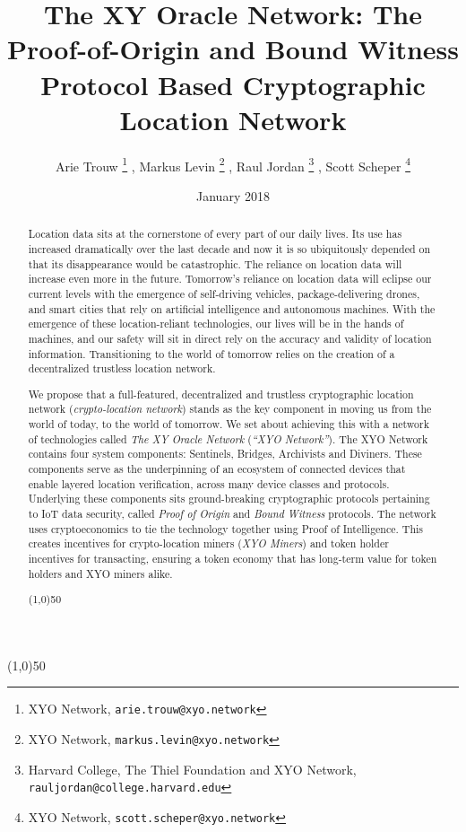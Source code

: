 \documentclass{article}
\title {The XY Oracle Network: The Proof-of-Origin and Bound Witness Protocol Based Cryptographic Location Network}
\author{
    Arie Trouw
        \thanks{XYO Network, \texttt{arie.trouw@xyo.network}}
    , Markus Levin
        \thanks{XYO Network, \texttt{markus.levin@xyo.network}}
    , Raul Jordan
        \thanks{Harvard College, The Thiel Foundation and XYO Network, \texttt{rauljordan@college.harvard.edu}}
    , Scott Scheper
        \thanks{XYO Network, \texttt{scott.scheper@xyo.network}}
}
\date{January 2018}
\begin{document}
\maketitle

\begin{center}
\line(1,0){50}
\end{center}


\begin{abstract}
Location data sits at the cornerstone of every part of our daily lives. Its use has increased dramatically over the last decade and now it is so ubiquitously depended on that its disappearance would be catastrophic. The reliance on location data will increase even more in the future. Tomorrow's reliance on location data will eclipse our current levels with the emergence of self-driving vehicles, package-delivering drones, and smart cities that rely on artificial intelligence and autonomous machines. With the emergence of these location-reliant technologies, our lives will be in the hands of machines, and our safety will sit in direct rely on the accuracy and validity of location information. Transitioning to the world of tomorrow relies on the creation of a decentralized trustless location network.

We propose that a full-featured, decentralized and trustless cryptographic location network (\textit{crypto-location network}) stands as the key component in moving us from the world of today, to the world of tomorrow. We set about achieving this with a network of technologies called \textit{The XY Oracle Network} (\textit{``XYO Network''}). The XYO Network contains four system components: Sentinels, Bridges, Archivists and Diviners. These components serve as the underpinning of an ecosystem of connected devices that enable layered location verification, across many device classes and protocols.  Underlying these components sits ground-breaking cryptographic protocols pertaining to IoT data security, called \textit{Proof of Origin} and \textit{Bound Witness} protocols. The network uses cryptoeconomics to tie the technology together using Proof of Intelligence. This creates incentives for crypto-location miners (\textit{XYO Miners}) and token holder incentives for transacting, ensuring a token economy that has long-term value for token holders and XYO miners alike.

\begin{center}
\line(1,0){50}
\end{center}
\end{abstract}
\end{document}
